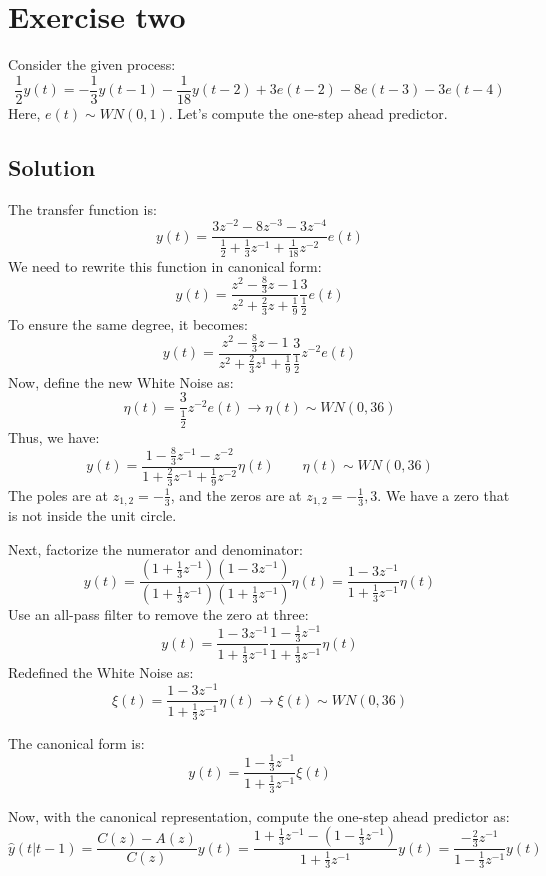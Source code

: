 \section{Exercise two}

Consider the given process:
\[\dfrac{1}{2}y(t)=-\dfrac{1}{3}y(t-1)-\dfrac{1}{18}y(t-2)+3e(t-2)-8e(t-3)-3e(t-4)\]
Here, $e(t)\sim WN(0,1)$. 
Let's compute the one-step ahead predictor.

\subsection*{Solution}
The transfer function is:
\[y(t)=\dfrac{3z^{-2}-8z^{-3}-3z^{-4}}{\frac{1}{2}+\frac{1}{3}z^{-1}+\frac{1}{18}z^{-2}}e(t)\]
We need to rewrite this function in canonical form:
\[y(t)=\dfrac{z^{2}-\frac{8}{3}z-1}{z^2+\frac{2}{3}z+\frac{1}{9}}\frac{3}{\frac{1}{2}}e(t)\]
To ensure the same degree, it becomes:
\[y(t)=\dfrac{z^{2}-\frac{8}{3}z-1}{z^2+\frac{2}{3}z^1+\frac{1}{9}}\frac{3}{\frac{1}{2}}z^{-2}e(t)\]
Now, define the new White Noise as:
\[\eta(t)=\frac{3}{\frac{1}{2}}z^{-2}e(t)\rightarrow \eta(t)\sim WN\left(0,36\right)\]
Thus, we have:
\[y(t)=\dfrac{1-\frac{8}{3}z^{-1}-z^{-2}}{1+\frac{2}{3}z^{-1}+\frac{1}{9}z^{-2}}\eta(t) \qquad \eta(t)\sim WN\left(0,36\right)\]
The poles are at $z_{1,2}=-\frac{1}{3}$, and the zeros are at $z_{1,2}=-\frac{1}{3},3$. 
We have a zero that is not inside the unit circle.

Next, factorize the numerator and denominator:
\[y(t)=\dfrac{\left(1+\frac{1}{3}z^{-1}\right)\left(1-3z^{-1}\right)}{\left(1+\frac{1}{3}z^{-1}\right)\left(1+\frac{1}{3}z^{-1}\right)}\eta(t)=\dfrac{1-3z^{-1}}{1+\frac{1}{3}z^{-1}}\eta(t) \]
Use an all-pass filter to remove the zero at three:
\[y(t)=\dfrac{1-3z^{-1}}{1+\frac{1}{3}z^{-1}}\dfrac{1-\frac{1}{3}z^{-1}}{1+\frac{1}{3}z^{-1}}\eta(t)\]
Redefined the White Noise as:
\[\xi(t)=\dfrac{1-3z^{-1}}{1+\frac{1}{3}z^{-1}}\eta(t)\rightarrow \xi(t)\sim WN(0,36)\]

The canonical form is:
\[y(t)=\dfrac{1-\frac{1}{3}z^{-1}}{1+\frac{1}{3}z^{-1}}\xi(t)\]

Now, with the canonical representation, compute the one-step ahead predictor as:
\[\hat{y}(t|t-1)=\dfrac{C(z)-A(z)}{C(z)}y(t)=\dfrac{1+\frac{1}{3}z^{-1}-\left(1-\frac{1}{3}z^{-1}\right)}{1+\frac{1}{3}z^{-1}}y(t)=\dfrac{-\frac{2}{3}z^{-1}}{1-\frac{1}{3}z^{-1}}y(t)\]